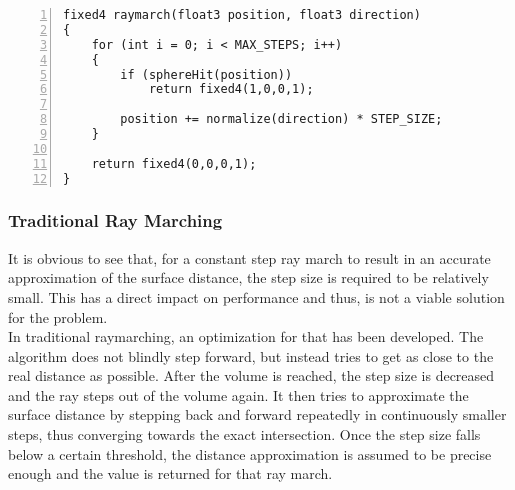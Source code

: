 \begin{lstlisting}[language=HLSL, numbers=left, caption=Ray march function with constant step.,captionpos=b, label=lst:shader:raymarch:constantstep]
fixed4 raymarch(float3 position, float3 direction)
{
    for (int i = 0; i < MAX_STEPS; i++)
    {
        if (sphereHit(position))
            return fixed4(1,0,0,1);
        
        position += normalize(direction) * STEP_SIZE;
    }
    
    return fixed4(0,0,0,1);
}
\end{lstlisting}


\pagebreak
\subsubsection{Traditional Ray Marching}
It is obvious to see that, for a constant step ray march to result in an accurate approximation of the surface distance, the step size is required to be relatively small.
This has a direct impact on performance and thus, is not a viable solution for the problem.
\\
In traditional \gls{raymarching}, an optimization for that has been developed. The algorithm does not blindly step forward, but instead tries to get as close to the real distance as possible.
After the volume is reached, the step size is decreased and the ray steps out of the volume again. It then tries to approximate the surface distance by stepping back and forward repeatedly in continuously smaller steps, thus converging towards the exact intersection.
Once the step size falls below a certain threshold, the distance approximation is assumed to be precise enough and the value is returned for that ray march.

